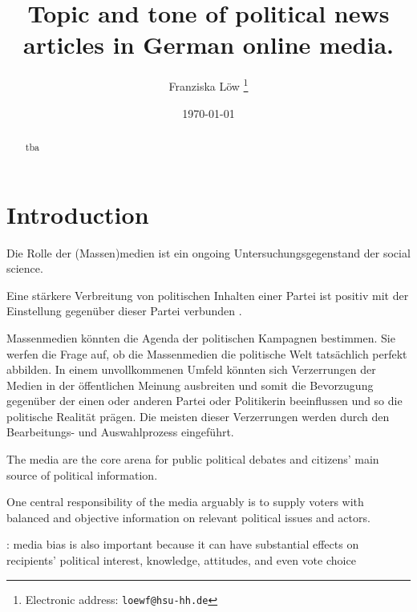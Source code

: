 \documentclass[12pt,a4paper,notitlepage]{article}
\title{Topic and tone of political news articles in German online media.}
\date{\today}
\author{Franziska Löw
  \thanks{Electronic address: \texttt{loewf@hsu-hh.de}}}
\affil{Department of Industrial Economics,\\ Helmut Schmidt University,\\ Hamburg, Germany}
\begin{document}
\begin{titlepage}
	\maketitle
	\begin{abstract}
	tba
	\end{abstract}

\end{titlepage}

\tableofcontents

\pagebreak

\section{Introduction}

Die Rolle der (Massen)medien ist ein ongoing Untersuchungsgegenstand der social science. 

Eine stärkere Verbreitung von politischen Inhalten einer Partei ist positiv mit der Einstellung gegenüber dieser Partei verbunden \citep{benewick_floating_1969}. 

\citet{mccombs_agenda-setting_1972} Massenmedien könnten die Agenda der politischen Kampagnen bestimmen. Sie werfen die Frage auf, ob die Massenmedien die politische Welt tatsächlich perfekt abbilden. In einem unvollkommenen Umfeld könnten sich Verzerrungen der Medien in der öffentlichen Meinung ausbreiten und somit die Bevorzugung gegenüber der einen oder anderen Partei oder Politikerin beeinflussen und so die politische Realität prägen. Die meisten dieser Verzerrungen werden durch den Bearbeitungs- und Auswahlprozess eingeführt. 

The media are the core arena for public political debates \citep{ferree_four_2002} and citizens' main source of political information. 


One central responsibility of the media arguably is to supply voters with balanced and objective information on relevant political issues and actors. \citep{stromback_four_2008, eberl_one_2017}

\citep{mccombs_look_2005}: media bias is also important because it can have substantial effects on recipients’ political interest, knowledge, attitudes, and even vote choice
\end{document}
